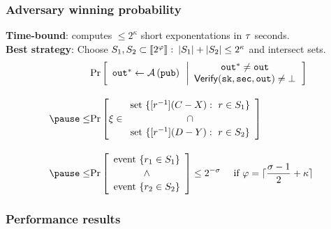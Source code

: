 \documentclass{beamer}
\begin{document}
\begin{frame}
    \frametitle{Adversary winning probability}
    \small
    \pause
    \textbf{Time-bound}: \adversary computes $\leq 2^\kappa$ short exponentations in $\tau$ seconds.
    \pause
    \\
    \textbf{Best strategy}: Choose $S_1,S_2\subset\left\llbracket 2^\varphi \right\rrbracket\colon\left\lvert S_1 \right\rvert+\left\lvert S_2 \right\rvert\leq 2^\kappa$ and intersect sets.
    \pause
    \begin{align*}
        &\myprob{\forge{\serveroutput}\gets\adversary\paren{\pubvalue}}{
                        \forge{\serveroutput}\neq\serveroutput\\
                        \onverify(\state,\secvalue,\serveroutput)\neq\bot}
        \\[10pt]
        \pause
        \leq&\myprobNoBar{\xi\in\begin{array}{c}
            \mathrm{set}\ \{[r^{-1}](C-X):\ r\in S_1\}\\[2pt]
            \cap\\[2pt]
            \mathrm{set}\ \{[r^{-1}](D-Y):\ r\in S_2\}
            \end{array}}
            \\[10pt]
            \pause
        \leq&\myprobNoBar{\begin{array}{c}
            \mathrm{event}\ \{r_1\in S_1\}\\[2pt]
            \wedge\\[2pt]
            \mathrm{event}\ \{r_2\in S_2\}
            \end{array}}
        \leq 2^{-\statsecpar}~~~\text{ if } \effpar=\lceil\frac{\statsecpar-1}{2}+\kappa\rceil
    \end{align*}

\end{frame}

\begin{frame}
    \frametitle{Performance results}
    
\end{frame}
\end{document}
